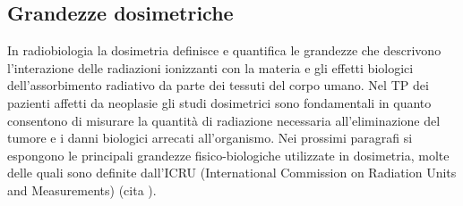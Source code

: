 \documentclass[12pt,a4paper,twoside]{report}
\begin{document}
	\subsection{Grandezze dosimetriche}
	In radiobiologia la dosimetria definisce e quantifica le grandezze che descrivono l'interazione delle radiazioni ionizzanti con la materia e gli effetti biologici dell'assorbimento radiativo da parte dei tessuti del corpo umano. Nel TP dei pazienti affetti da neoplasie gli studi dosimetrici sono fondamentali in quanto consentono di misurare la quantità di radiazione necessaria all'eliminazione del tumore e i danni biologici arrecati all'organismo. Nei prossimi paragrafi si espongono le principali grandezze fisico-biologiche utilizzate in dosimetria, molte delle quali sono definite dall'ICRU (International Commission on Radiation Units and Measurements) (cita
	).
	
\end{document}
